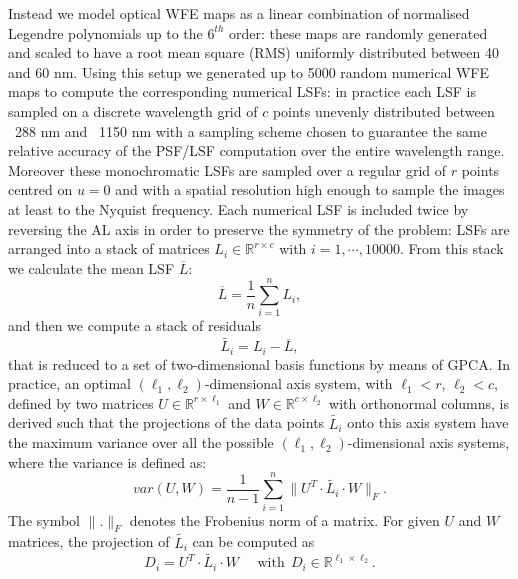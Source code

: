 \documentclass{aa}
\begin{document}
\begin{appendix}
Instead we model optical WFE maps as a linear combination of normalised Legendre polynomials up to the $6^{th}$ order: these maps are randomly generated and scaled to have a root mean square (RMS) uniformly distributed between 40 and 60 nm.
Using this setup we generated up to 5000 random numerical WFE maps to compute the corresponding numerical LSFs: in practice each LSF is sampled on a discrete wavelength grid of $c$
points unevenly distributed between ~288 nm and ~1150 nm with a sampling scheme chosen to guarantee the same relative accuracy of the PSF/LSF computation over the entire wavelength range. Moreover these monochromatic LSFs are sampled over a regular grid of $r$
points centred on $u=0$ and with a spatial resolution high enough to sample the images at least to the Nyquist frequency. Each numerical LSF is  included twice by reversing the AL axis in order to preserve the symmetry of the problem: LSFs are arranged into a stack of matrices $L_i \in \mathbb{R}^{r\times c}$ with $i = 1,\cdots, 10000$.
From this stack 
we calculate the mean LSF $\overline{L}$:
\begin{equation}
\label{eq:lsfMean}
\overline{L} = \frac{1}{n}\sum_{i=1}^n L_i
,\end{equation}
and then we compute a stack of residuals
\begin{equation}
\label{lLsfResidual}
\widetilde{L_i} = L_i - \overline{L}
,\end{equation}
that is reduced to a set of two-dimensional basis functions by means of GPCA.
In practice, an optimal $(\ell_1, \ell_2)$-dimensional axis system, with $\ell_1 < r$, $\ell_2 < c$,  defined by two matrices $U\! \in\mathbb{R}^{r\times \ell_1}$ and $W\! \in\mathbb{R}^{c\times \ell_2}$ with orthonormal columns, 
is derived such that the projections of the data points $\widetilde{L_i}$ onto this axis system have the maximum variance over all the possible $(\ell_1, \ell_2)$-dimensional axis systems, where the variance is defined as:
\begin{equation}
\label{eq:lsfLVariance}
var(U, W) = \frac{1}{n-1}\sum_{i=1}^n \|U^T \cdot \widetilde{L_i}  \cdot W  \|_F
.\end{equation}
The symbol $\|.\|_F$ denotes the Frobenius norm of a matrix.
For given $U$ and $W$ matrices, the projection of $\widetilde{L_i} $ can be computed as
\begin{equation}
\label{eq:projCoeffs}
D_i = U^T \cdot \widetilde{L_i} \cdot W~~~~~~\textrm{with}~~D_i\in \mathbb{R}^{\ell_1 \times \ell_2}
.\end{equation}

\end{appendix}
\end{document}
